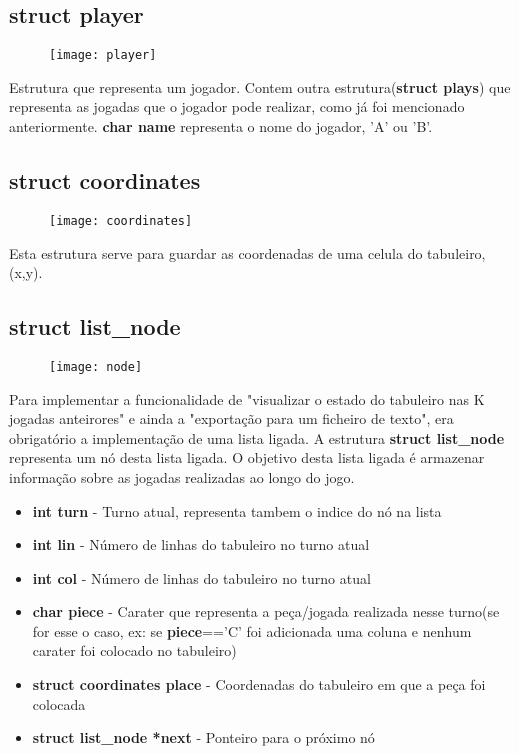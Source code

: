 \documentclass[14pt]{extarticle}
\begin{document}
\newpage
\subsection{struct player}
\begin{figure}[h]
    \centering
    \texttt{[image: player]}
\end{figure}
Estrutura que representa um jogador. Contem outra estrutura(\textbf{struct plays}) que representa as jogadas que o jogador pode realizar, como já foi mencionado anteriormente. \textbf{char name} representa o nome do jogador, 'A' ou 'B'.
\subsection{struct coordinates}
\begin{figure}[h]
    \centering
    \texttt{[image: coordinates]}
\end{figure}
Esta estrutura serve para guardar as coordenadas de uma celula do tabuleiro, (x,y).
\newpage
\subsection{struct list\_node}
\begin{figure}[h]
    \centering
    \texttt{[image: node]}
\end{figure}
Para implementar a funcionalidade de "visualizar o estado do tabuleiro nas K jogadas anteirores" e ainda a "exportação para um ficheiro de texto", era obrigatório a implementação de uma lista ligada. A estrutura \textbf{struct list\_node} representa um nó desta lista ligada. O objetivo desta lista ligada é armazenar informação sobre as jogadas realizadas ao longo do jogo.
\begin{itemize}
\item \textbf{int turn} - Turno atual, representa tambem o indice do nó na lista
\item \textbf{int lin} - Número de linhas do tabuleiro no turno atual
\item \textbf{int col} - Número de linhas do tabuleiro no turno atual
\item \textbf{char piece} - Carater que representa a peça/jogada realizada nesse turno(se for esse o caso, ex: se \textbf{piece}=='C' foi adicionada uma coluna e nenhum carater foi colocado no tabuleiro)
\item \textbf{struct coordinates place} - Coordenadas do tabuleiro em que a peça foi colocada
\item \textbf{struct list\_node *next} - Ponteiro para o próximo nó
\end{itemize}
\end{document}
